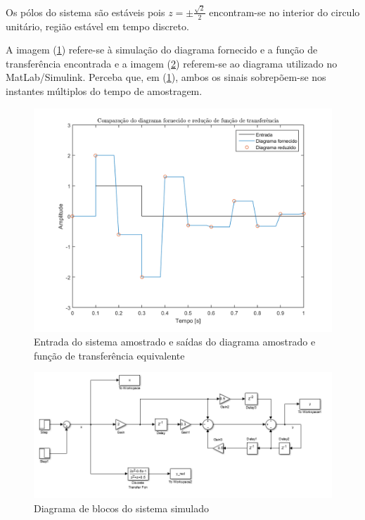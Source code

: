 \documentclass{article}
\begin{document}
Os pólos do sistema são estáveis pois $z = \pm\frac{\sqrt{2}}{2}$ encontram-se no interior do circulo unitário, região estável em tempo discreto.

A imagem (\ref{fig:ex3sim}) refere-se à simulação do diagrama fornecido e a função de transferência encontrada e a imagem (\ref{fig:ex3diag}) referem-se ao diagrama utilizado no MatLab/Simulink. Perceba que, em (\ref{fig:ex3sim}), ambos os sinais sobrepõem-se nos instantes múltiplos do tempo de amostragem. 

\begin{figure}[!h]
	\center
	\includegraphics[width=\textwidth]{./images/ex31.png}
	\caption{Entrada do sistema amostrado e saídas do diagrama amostrado e função de transferência equivalente}
	\label{fig:ex3sim}
\end{figure}

\begin{figure}[!h]
	\center
	\includegraphics[width=\textwidth]{./images/ex3simulink.png}
	\caption{Diagrama de blocos do sistema simulado}
	\label{fig:ex3diag}
\end{figure}
\end{document}
